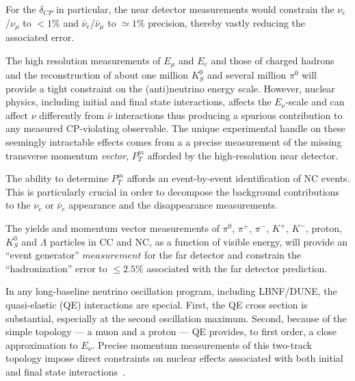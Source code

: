 \noindent
For the $\delta_{CP}$ in particular, the near detector measurements would constrain the $\nu_e$/$\nu_\mu$ to 
$<1\%$ and $\bar \nu_e$/$\bar \nu_\mu$ to $\simeq 1\%$ precision, thereby vastly reducing the associated error. 



The high resolution 
measurements of $E_\mu$ and $E_e$ and those of charged hadrons and the reconstruction of about one 
million $K^0_S$ and several million $\pi^0$ will provide a tight constraint on the (anti)neutrino energy scale. 
However, nuclear physics, including initial and final state interactions, 
 affects the $E_\nu$-scale and can affect $\nu$ differently from $\bar\nu$ interactions thus  
producing a spurious contribution to any measured CP-violating observable. 
The unique experimental handle on these seemingly intractable effects comes from a 
a precise measurement of the missing transverse momentum {\it vector},{ \bf{ $P^m_T$}} afforded by the 
high-resolution near detector. 


The ability to determine {\bf{$P^m_T$}} affords an event-by-event 
identification of NC events. This is particularly crucial in order to decompose the background contributions to 
the $\nu_e$ or $\bar \nu_e$ appearance and the disappearance measurements. 


The yields and momentum vector measurements of %
$\pi^0$, $\pi^+$, $\pi^-$, $K^+$, $K^-$, proton, $K^0_S$ and $\Lambda$ particles in CC and NC, as a function of 
visible energy, will provide an ``event generator'' $measurement$ for the far detector and constrain the 
``hadronization'' error to $\leq 2.5\%$ associated with the far detector prediction. 



In any long-baseline neutrino oscillation program, including LBNF/DUNE, 
the quasi-elastic (QE) interactions are special. First, the QE cross section is substantial, especially at the second oscillation maximum. 
Second, because of the simple topology --- a muon and a proton --- QE provides, to  first order, 
a close approximation to $E_\nu$.  
Precise momentum measurements  of this two-track topology impose direct constraints on nuclear effects 
associated with both initial and final state interactions~\cite{near-detector-QE}. 

